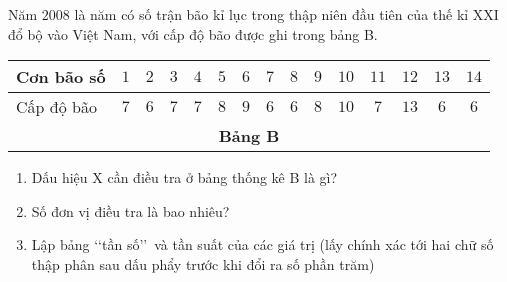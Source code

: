 \begin{vd}%
	Năm $2008$ là năm có số trận bão kỉ lục trong thập niên đầu tiên của thế kỉ XXI đổ bộ vào Việt Nam, với cấp độ bão được ghi trong bảng B.
	\begin{center}
		\begin{tabular}{|l|c|c|c|c|c|c|c|c|c|c|c|c|c|c|}
			\hline
			Cơn bão số &$1$ &$2$ &$3$ &$4$ &$5$ &$6$ &$7$ &$8$ &$9$ &$10$ &$11$ &$12$ &$13$ &$14$\\
			\hline
			Cấp độ bão &$7$ &$6$ &$7$ &$7$ &$8$ &$9$ &$6$ &$6$ &$8$ &$10$ &$7$ &$13$ &$6$ &$6$\\
			\hline
			\multicolumn{15}{c}{\textbf{Bảng B}}
		\end{tabular}
	\end{center}
	\begin{enumerate}
		\item Dấu hiệu X cần điều tra ở bảng thống kê B là gì?
		\item Số đơn vị điều tra là bao nhiêu?
		\item Lập bảng \lq\lq tần số\rq\rq\ và tần suất của các giá trị (lấy chính xác tới hai chữ số thập phân sau dấu phẩy trước khi đổi ra số phần trăm)
	\end{enumerate}
\end{vd}
